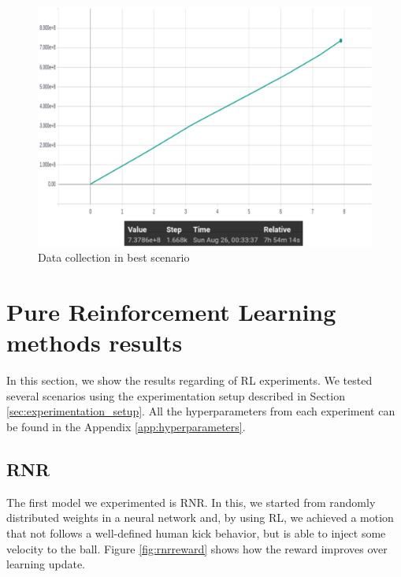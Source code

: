 \begin{figure}[!htbp]
	\centering
	\includegraphics[width=1\textwidth]{Cap6/absolutedatacollection}
	\caption{Data collection in best scenario}
	\label{fig:absdatacollection}
\end{figure}



\section{Pure Reinforcement Learning methods results}

In this section, we show the results regarding of RL experiments. We tested several scenarios using the experimentation setup described in Section \ref{sec:experimentation_setup}. All the hyperparameters from each experiment can be found in the Appendix \ref{app:hyperparameters}.

\subsection{RNR}

The first model we experimented is RNR. In this, we started from randomly distributed weights in a neural network and, by using RL, we achieved a motion that not follows a well-defined human kick behavior, but is able to inject some velocity to the ball. Figure \ref{fig:rnrreward} shows how the reward improves over learning update.

